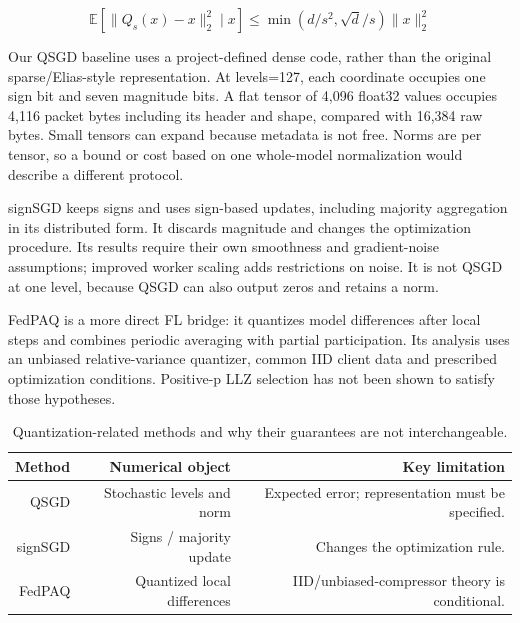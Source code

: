 \documentclass[11pt,a4paper]{article}
\begin{document}
\begin{equation*}\mathbb{E}[\|Q_s(x)-x\|_2^2\mid x] \leq \min(d/s^2,\sqrt{d}/s)\|x\|_2^2\end{equation*}

Our QSGD baseline uses a project-defined dense code, rather than the original sparse/Elias-style representation. At levels=127, each coordinate occupies one sign bit and seven magnitude bits. A flat tensor of 4,096 float32 values occupies 4,116 packet bytes including its header and shape, compared with 16,384 raw bytes. Small tensors can expand because metadata is not free. Norms are per tensor, so a bound or cost based on one whole-model normalization would describe a different protocol.

signSGD keeps signs and uses sign-based updates, including majority aggregation in its distributed form. It discards magnitude and changes the optimization procedure. Its results require their own smoothness and gradient-noise assumptions; improved worker scaling adds restrictions on noise. It is not QSGD at one level, because QSGD can also output zeros and retains a norm. \parencite{bernstein2018signsgd}

FedPAQ is a more direct FL bridge: it quantizes model differences after local steps and combines periodic averaging with partial participation. Its analysis uses an unbiased relative-variance quantizer, common IID client data and prescribed optimization conditions. Positive-p LLZ selection has not been shown to satisfy those hypotheses. \parencite{reisizadeh2020fedpaq}

\begin{table}[htbp]
\centering
\small
\begin{tabularx}{\textwidth}{R{0.57000}R{0.96000}R{1.47000}}
\toprule
\textbf{Method} & \textbf{Numerical object} & \textbf{Key limitation} \\\midrule
QSGD & Stochastic levels and norm & Expected error; representation must be specified. \parencite{alistarh2017qsgd} \\
signSGD & Signs / majority update & Changes the optimization rule. \parencite{bernstein2018signsgd} \\
FedPAQ & Quantized local differences & IID/unbiased-compressor theory is conditional. \parencite{reisizadeh2020fedpaq} \\
\bottomrule
\end{tabularx}
\caption{Quantization-related methods and why their guarantees are not interchangeable.}
\label{tab:quantization}
\end{table}
\end{document}
